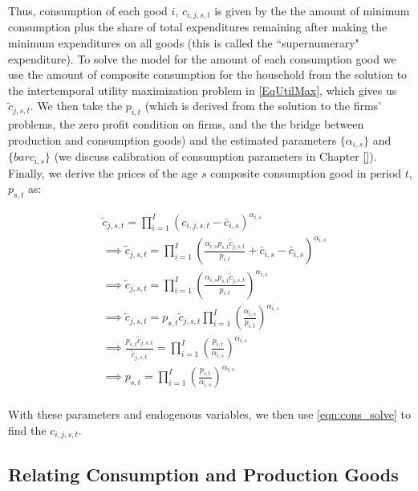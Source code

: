    Thus, consumption of each good $i$, $c_{i,j,s,t}$ is given by the the amount of minimum consumption plus the share of total expenditures remaining after making the minimum expenditures on all goods (this is called the ``supernumerary" expenditure).  To solve the model for the amount of each consumption good we use the amount of composite consumption for the household from the solution to the intertemporal utility maximization problem in \ref{EqUtilMax}, which gives us $\tilde{c}_{j,s,t}$. We then take the $p_{i,t}$ (which is derived from the solution to the firms' problems, the zero profit condition on firms, and the the bridge between production and consumption goods) and the estimated parameters $\{\alpha_{i,s}\}$ and $\{bar{c}_{i,s}\}$ (we discuss calibration of consumption parameters in Chapter \ref{}).  Finally, we derive the prices of the age $s$ composite consumption good in period $t$, $p_{s,t}$ as: 
    
              \begin{equation} \label{eqn:composite_price}
      \begin{split}
      & \tilde{c}_{j,s,t} = \prod_{i=1}^{I}(c_{i,j,s,t}-\bar{c}_{i,s})^{\alpha_{i,s}} \\
      &\implies \tilde{c}_{j,s,t} = \prod_{i=1}^{I}\left( \frac{\alpha_{i,s} p_{s,t}\tilde{c}_{j,s,t}}{p_{i,t}} + \bar{c}_{i,s}-\bar{c}_{i,s}\right)^{\alpha_{i,s}} \\
      &\implies \tilde{c}_{j,s,t} = \prod_{i=1}^{I} \left( \frac{\alpha_{i,s} p_{s,t}\tilde{c}_{j,s,t}}{p_{i,t}} \right)^{\alpha_{i,s}} \\
      &\implies \tilde{c}_{j,s,t} =  p_{s,t}\tilde{c}_{j,s,t} \prod_{i=1}^{I}\left( \frac{\alpha_{i,s}}{p_{i,t}} \right)^{\alpha_{i,s}} \\
      &\implies \frac{p_{s,t}\tilde{c}_{j,s,t}}{\tilde{c}_{j,s,t}} =  \prod_{i=1}^{I}\left( \frac{p_{i,t}}{\alpha_{i,s}} \right)^{\alpha_{i,s}} \\
       &\implies p_{s,t} =  \prod_{i=1}^{I}\left( \frac{p_{i,t}}{\alpha_{i,s}} \right)^{\alpha_{i,s}} \\
       \end{split}
    \end{equation}
    
    With these parameters and endogenous variables, we then use \ref{eqn:cons_solve} to find the $c_{i,j,s,t}$.
    
    \subsection{Relating Consumption and Production Goods}\label{sec:prod_cons_map}
    
